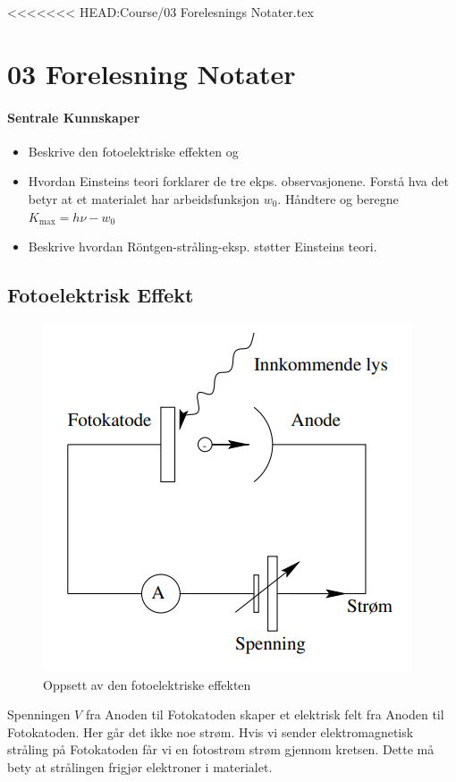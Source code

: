 <<<<<<< HEAD:Course/03 Forelesnings Notater.tex
\section{03 Forelesning Notater}
\paragraph{Sentrale Kunnskaper}
\begin{itemize}
    \item Beskrive den fotoelektriske effekten og 
    \item Hvordan Einsteins teori forklarer de tre ekps. observasjonene. Forstå hva det betyr at et materialet har arbeidsfunksjon $w_0$. Håndtere og beregne $K_{\text{max}} = hν - w_0$
    \item Beskrive hvordan Röntgen-stråling-eksp. støtter Einsteins teori.
\end{itemize}
\subsection{Fotoelektrisk Effekt}


\begin{figure}[h!]
  \centering
  \includegraphics[scale = .5]{Figures/Fotoeletkrisk effekt oppsett.png}
  \caption{Oppsett av den fotoelektriske effekten}
  \label{fig: Fotoelektrisk effekt oppsett}
\end{figure}
Spenningen $V$ fra Anoden til Fotokatoden skaper et elektrisk felt fra Anoden til Fotokatoden. Her går det ikke noe strøm. Hvis vi sender elektromagnetisk stråling på Fotokatoden får vi en fotostrøm strøm gjennom kretsen. Dette må bety at strålingen frigjør elektroner i materialet.


